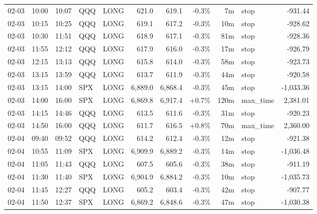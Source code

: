 \documentclass[11pt,a4paper,twoside]{article}
\begin{document}
\begin{center}
\begin{longtable}{>{\color{txtmain}}l l l l l r r r r >{\color{txtmain}}l r}
02-03 & 10:00 & 10:07 & QQQ & LONG & 621.0 & 619.1 & \textcolor{lossred}{-0.3\%} & 7m & stop & \textcolor{lossred}{-931.44} \\
02-03 & 10:15 & 10:25 & QQQ & LONG & 619.1 & 617.2 & \textcolor{lossred}{-0.3\%} & 10m & stop & \textcolor{lossred}{-928.62} \\
02-03 & 10:30 & 11:51 & QQQ & LONG & 618.9 & 617.1 & \textcolor{lossred}{-0.3\%} & 81m & stop & \textcolor{lossred}{-928.36} \\
02-03 & 11:55 & 12:12 & QQQ & LONG & 617.9 & 616.0 & \textcolor{lossred}{-0.3\%} & 17m & stop & \textcolor{lossred}{-926.79} \\
02-03 & 12:15 & 13:13 & QQQ & LONG & 615.8 & 614.0 & \textcolor{lossred}{-0.3\%} & 58m & stop & \textcolor{lossred}{-923.73} \\
02-03 & 13:15 & 13:59 & QQQ & LONG & 613.7 & 611.9 & \textcolor{lossred}{-0.3\%} & 44m & stop & \textcolor{lossred}{-920.58} \\
02-03 & 13:15 & 14:00 & SPX & LONG & 6,889.0 & 6,868.4 & \textcolor{lossred}{-0.3\%} & 45m & stop & \textcolor{lossred}{-1,033.36} \\
02-03 & 14:00 & 16:00 & SPX & LONG & 6,869.8 & 6,917.4 & \textcolor{wingreen}{+0.7\%} & 120m & max\_time & \textcolor{wingreen}{2,381.01} \\
02-03 & 14:15 & 14:46 & QQQ & LONG & 613.5 & 611.6 & \textcolor{lossred}{-0.3\%} & 31m & stop & \textcolor{lossred}{-920.23} \\
02-03 & 14:50 & 16:00 & QQQ & LONG & 611.7 & 616.5 & \textcolor{wingreen}{+0.8\%} & 70m & max\_time & \textcolor{wingreen}{2,360.00} \\
02-04 & 09:40 & 09:52 & QQQ & LONG & 614.2 & 612.4 & \textcolor{lossred}{-0.3\%} & 12m & stop & \textcolor{lossred}{-921.38} \\
02-04 & 10:55 & 11:09 & SPX & LONG & 6,909.9 & 6,889.2 & \textcolor{lossred}{-0.3\%} & 14m & stop & \textcolor{lossred}{-1,036.48} \\
02-04 & 11:05 & 11:43 & QQQ & LONG & 607.5 & 605.6 & \textcolor{lossred}{-0.3\%} & 38m & stop & \textcolor{lossred}{-911.19} \\
02-04 & 11:30 & 11:40 & SPX & LONG & 6,904.9 & 6,884.2 & \textcolor{lossred}{-0.3\%} & 10m & stop & \textcolor{lossred}{-1,035.73} \\
02-04 & 11:45 & 12:27 & QQQ & LONG & 605.2 & 603.4 & \textcolor{lossred}{-0.3\%} & 42m & stop & \textcolor{lossred}{-907.77} \\
02-04 & 11:50 & 12:37 & SPX & LONG & 6,869.2 & 6,848.6 & \textcolor{lossred}{-0.3\%} & 47m & stop & \textcolor{lossred}{-1,030.38} \\

\end{longtable}
\end{center}
\end{document}
